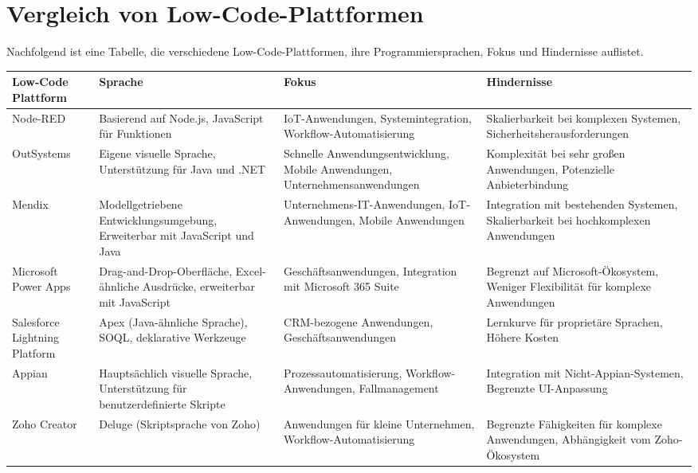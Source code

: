
\section{Vergleich von Low-Code-Plattformen}
Nachfolgend ist eine Tabelle, die verschiedene Low-Code-Plattformen, ihre Programmiersprachen, Fokus und Hindernisse auflistet.

\begin{longtable}{|m{3cm}|m{3cm}|m{4cm}|m{5cm}|}
\hline
\textbf{Low-Code Plattform} & \textbf{Sprache} & \textbf{Fokus} & \textbf{Hindernisse} \\
\hline
\endhead
Node-RED & Basierend auf Node.js, JavaScript für Funktionen & IoT-Anwendungen, Systemintegration, Workflow-Automatisierung & Skalierbarkeit bei komplexen Systemen, Sicherheitsherausforderungen\\
\hline
OutSystems & Eigene visuelle Sprache, Unterstützung für Java und .NET & Schnelle Anwendungsentwicklung, Mobile Anwendungen, Unternehmensanwendungen & Komplexität bei sehr großen Anwendungen, Potenzielle Anbieterbindung \\
\hline
Mendix & Modellgetriebene Entwicklungsumgebung, Erweiterbar mit JavaScript und Java & Unternehmens-IT-Anwendungen, IoT-Anwendungen, Mobile Anwendungen & Integration mit bestehenden Systemen, Skalierbarkeit bei hochkomplexen Anwendungen \\
\hline
Microsoft Power Apps & Drag-and-Drop-Oberfläche, Excel-ähnliche Ausdrücke, erweiterbar mit JavaScript & Geschäftsanwendungen, Integration mit Microsoft 365 Suite & Begrenzt auf Microsoft-Ökosystem, Weniger Flexibilität für komplexe Anwendungen \\
\hline
Salesforce Lightning Platform & Apex (Java-ähnliche Sprache), SOQL, deklarative Werkzeuge & CRM-bezogene Anwendungen, Geschäftsanwendungen & Lernkurve für proprietäre Sprachen, Höhere Kosten \\
\hline
Appian & Hauptsächlich visuelle Sprache, Unterstützung für benutzerdefinierte Skripte & Prozessautomatisierung, Workflow-Anwendungen, Fallmanagement & Integration mit Nicht-Appian-Systemen, Begrenzte UI-Anpassung \\
\hline
Zoho Creator & Deluge (Skriptsprache von Zoho) & Anwendungen für kleine Unternehmen, Workflow-Automatisierung & Begrenzte Fähigkeiten für komplexe Anwendungen, Abhängigkeit vom Zoho-Ökosystem \\
\hline
\end{longtable}
